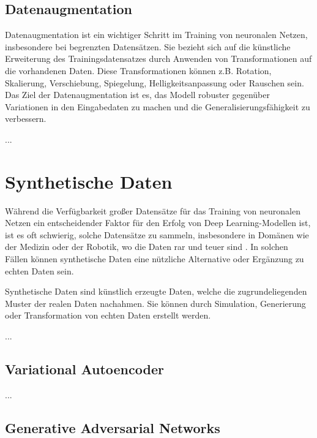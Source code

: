 \subsection{Datenaugmentation}

Datenaugmentation ist ein wichtiger Schritt im Training von neuronalen Netzen, insbesondere bei begrenzten Datensätzen. Sie bezieht sich auf die künstliche Erweiterung des Trainingsdatensatzes durch Anwenden von Transformationen auf die vorhandenen Daten. Diese Transformationen können z.B. Rotation, Skalierung, Verschiebung, Spiegelung, Helligkeitsanpassung oder Rauschen sein. Das Ziel der Datenaugmentation ist es, das Modell robuster gegenüber Variationen in den Eingabedaten zu machen und die Generalisierungsfähigkeit zu verbessern.

...

\section{Synthetische Daten}


Während die Verfügbarkeit großer Datensätze für das Training von neuronalen Netzen ein entscheidender Faktor für den Erfolg von Deep Learning-Modellen ist, ist es oft schwierig, solche Datensätze zu sammeln, insbesondere in Domänen wie der Medizin oder der Robotik, wo die Daten rar und teuer sind \cite{}. In solchen Fällen können synthetische Daten eine nützliche Alternative oder Ergänzung zu echten Daten sein.

Synthetische Daten sind künstlich erzeugte Daten, welche die zugrundeliegenden Muster der realen Daten nachahmen. Sie können durch Simulation, Generierung oder Transformation von echten Daten erstellt werden.

...

\subsection{Variational Autoencoder}

...

\subsection{Generative Adversarial Networks}

